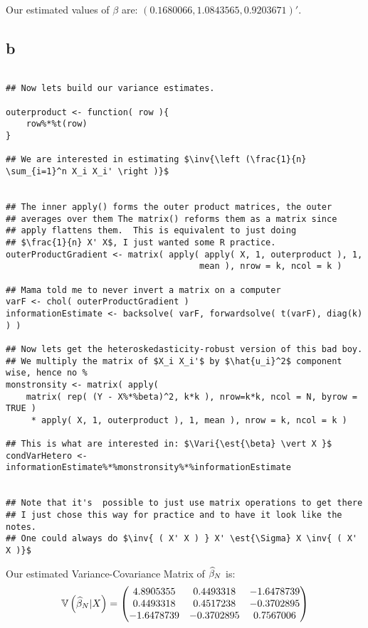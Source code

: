 \documentclass[12pt]{paper}
\begin{document}
Our estimated values of $\beta$ are: $(0.1680066, 1.0843565, 0.9203671)'$.

\subsection*{b}



\begin{verbatim}

## Now lets build our variance estimates.

outerproduct <- function( row ){
    row%*%t(row)
}

## We are interested in estimating $\inv{\left (\frac{1}{n} \sum_{i=1}^n X_i X_i' \right )}$


## The inner apply() forms the outer product matrices, the outer
## averages over them The matrix() reforms them as a matrix since
## apply flattens them.  This is equivalent to just doing
## $\frac{1}{n} X' X$, I just wanted some R practice.
outerProductGradient <- matrix( apply( apply( X, 1, outerproduct ), 1,
                                      mean ), nrow = k, ncol = k )

## Mama told me to never invert a matrix on a computer
varF <- chol( outerProductGradient )
informationEstimate <- backsolve( varF, forwardsolve( t(varF), diag(k) ) )

## Now lets get the heteroskedasticity-robust version of this bad boy.
## We multiply the matrix of $X_i X_i'$ by $\hat{u_i}^2$ component wise, hence no % 
monstronsity <- matrix( apply(
    matrix( rep( (Y - X%*%beta)^2, k*k ), nrow=k*k, ncol = N, byrow = TRUE )
     * apply( X, 1, outerproduct ), 1, mean ), nrow = k, ncol = k )

## This is what are interested in: $\Vari{\est{\beta} \vert X }$
condVarHetero <- informationEstimate%*%monstronsity%*%informationEstimate


## Note that it's  possible to just use matrix operations to get there
## I just chose this way for practice and to have it look like the notes.
## One could always do $\inv{ ( X' X ) } X' \est{\Sigma} X \inv{ ( X' X )}$

\end{verbatim}

Our estimated Variance-Covariance Matrix of $\widehat{ \beta }_{N}$ is:
\begin{equation*}
  \mathbb{V} \left (  \widehat{ \beta }_{N} \vert X \right ) =
  \begin{pmatrix}
     4.8905355 &  0.4493318 & -1.6478739\\
  0.4493318 &  0.4517238 & -0.3702895\\
 -1.6478739 & -0.3702895 &  0.7567006\\
  \end{pmatrix}
\end{equation*}
\end{document}
